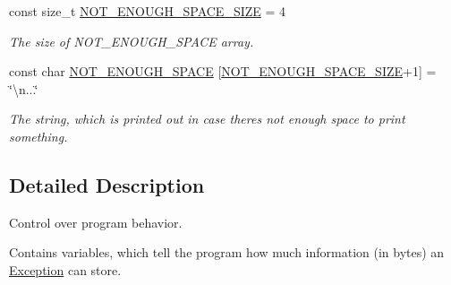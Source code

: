 \begin{DoxyCompactItemize}
\mbox{\label{namespace_va_exc_1_1__control_aab0e41d60c1e391ce02ca157f0ece87d}} 
const size\+\_\+t \hyperlink{namespace_va_exc_1_1__control_aab0e41d60c1e391ce02ca157f0ece87d}{N\+O\+T\+\_\+\+E\+N\+O\+U\+G\+H\+\_\+\+S\+P\+A\+C\+E\+\_\+\+S\+I\+ZE} = 4
\begin{DoxyCompactList}\small\item\em The size of N\+O\+T\+\_\+\+E\+N\+O\+U\+G\+H\+\_\+\+S\+P\+A\+CE array. \end{DoxyCompactList}\item 
\mbox{\label{namespace_va_exc_1_1__control_a3ef4fb5234c0e1806cceb6adc7b7952d}} 
const char \hyperlink{namespace_va_exc_1_1__control_a3ef4fb5234c0e1806cceb6adc7b7952d}{N\+O\+T\+\_\+\+E\+N\+O\+U\+G\+H\+\_\+\+S\+P\+A\+CE} \mbox{[}\hyperlink{namespace_va_exc_1_1__control_aab0e41d60c1e391ce02ca157f0ece87d}{N\+O\+T\+\_\+\+E\+N\+O\+U\+G\+H\+\_\+\+S\+P\+A\+C\+E\+\_\+\+S\+I\+ZE}+1\mbox{]} = \char`\"{}\textbackslash{}n...\char`\"{}
\begin{DoxyCompactList}\small\item\em The string, which is printed out in case there\textquotesingle{}s not enough space to print something. \end{DoxyCompactList}\end{DoxyCompactItemize}


\subsection{Detailed Description}
Control over program behavior. 

Contains variables, which tell the program how much information (in bytes) an \hyperlink{class_va_exc_1_1_exception}{Exception} can store. 